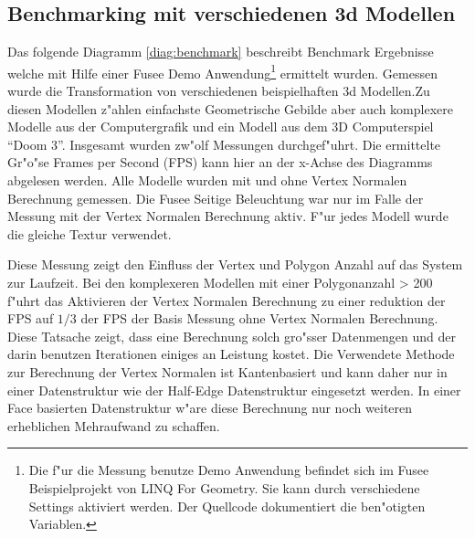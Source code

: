 \documentclass[pagesize, paper=a4, fontsize=12pt,titlepage=true, headings=small, headnosepline, abstractoff, liststotoc, nochapterprefix, plainheadsepline]{scrreprt}
\newcommand{\LFG}{LINQ For Geometry}
\newcommand{\HES}{Half-Edge Datenstruktur }
\begin{document}
\subsection{Benchmarking mit verschiedenen 3d Modellen}
Das folgende Diagramm \ref{diag:benchmark} beschreibt Benchmark Ergebnisse welche mit Hilfe einer Fusee Demo Anwendung\footnote{Die f"ur die Messung benutze Demo Anwendung befindet sich im Fusee Beispielprojekt von \LFG. Sie kann durch verschiedene Settings aktiviert werden. Der Quellcode dokumentiert die ben"otigten Variablen.} ermittelt wurden. Gemessen wurde die Transformation von verschiedenen beispielhaften 3d Modellen.Zu diesen Modellen z"ahlen einfachste Geometrische Gebilde aber auch komplexere Modelle aus der Computergrafik und ein Modell aus dem 3D Computerspiel "`Doom 3"'. Insgesamt wurden zw"olf Messungen durchgef"uhrt. Die ermittelte Gr"o"se Frames per Second (FPS) kann hier an der x-Achse des Diagramms abgelesen werden. Alle Modelle wurden mit und ohne Vertex Normalen Berechnung gemessen. Die Fusee Seitige Beleuchtung war nur im Falle der Messung mit der Vertex Normalen Berechnung aktiv. F"ur jedes Modell wurde die gleiche Textur verwendet.
\newline

Diese Messung zeigt den Einfluss der Vertex und Polygon Anzahl auf das System zur Laufzeit. Bei den komplexeren Modellen mit einer Polygonanzahl > 200 f"uhrt das Aktivieren der Vertex Normalen Berechnung zu einer reduktion der FPS auf $1/3$ der FPS der Basis Messung ohne Vertex Normalen Berechnung. Diese Tatsache zeigt, dass eine Berechnung solch gro"sser Datenmengen und der darin benutzen Iterationen einiges an Leistung kostet. Die Verwendete Methode zur Berechnung der Vertex Normalen ist Kantenbasiert und kann daher nur in einer Datenstruktur wie der \HES eingesetzt werden. In einer Face basierten Datenstruktur w"are diese Berechnung nur noch weiteren erheblichen Mehraufwand zu schaffen.


 \label{diag:benchmark}


\end{document}
